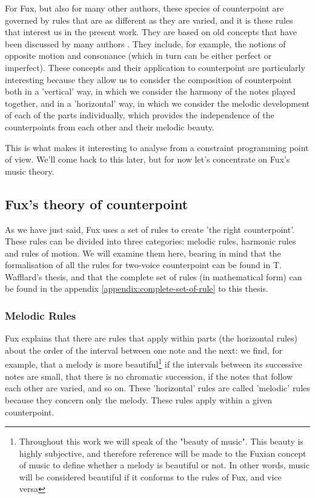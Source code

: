 For Fux, but also for many other authors, these species of counterpoint are governed by rules that are as different as they are varied, and it is these rules that interest us in the present work. They are based on old concepts that have been discussed by many authors \cite{crocker1962}. They include, for example, the notions of opposite motion and consonance (which in turn can be either perfect or imperfect). These concepts and their application to counterpoint are particularly interesting because they allow us to consider the composition of counterpoint both in a 'vertical' way, in which we consider the harmony of the notes played together, and in a 'horizontal' way, in which we consider the melodic development of each of the parts individually, which provides the independence of the counterpoints from each other and their melodic beauty.

This is what makes it interesting to analyse from a constraint programming point of view. We'll come back to this later, but for now let's concentrate on Fux's music theory.

\subsection{Fux's theory of counterpoint}
As we have just said, Fux uses a set of rules to create 'the right counterpoint'. These rules can be divided into three categories: melodic rules, harmonic rules and rules of motion. We will examine them here, bearing in mind that the formalisation of all the rules for two-voice counterpoint can be found in T. Wafflard's thesis, and that the complete set of rules (in mathematical form) can be found in the appendix \ref{appendix:complete-set-of-rule} to this thesis.

\subsubsection{Melodic Rules}

Fux explains that there are rules that apply within parts (the horizontal rules) about the order of the interval between one note and the next: we find, for example, that a melody is more beautiful\footnote{Throughout this work we will speak of the "beauty of music". This beauty is highly subjective, and therefore reference will be made to the Fuxian concept of music to define whether a melody is beautiful or not. In other words, music will be considered beautiful if it conforms to the rules of Fux, and vice versa} if the intervals between its successive notes are small, that there is no chromatic succession, if the notes that follow each other are varied, and so on. These 'horizontal' rules are called 'melodic' rules because they concern only the melody. These rules apply within a given counterpoint.


